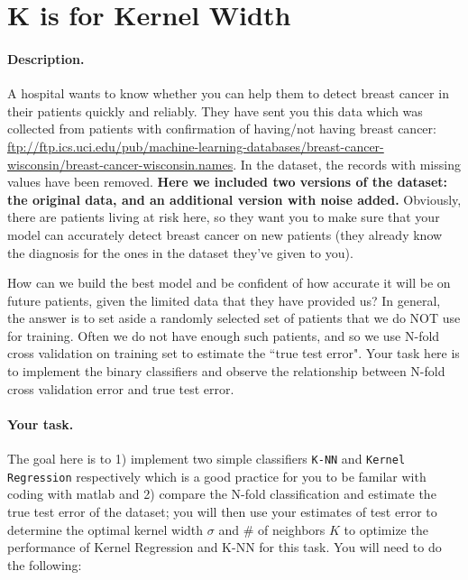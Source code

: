 \documentclass[english]{article}
\begin{document}
\section{K is for Kernel Width }

\paragraph{Description.} A hospital wants to know whether you can help them to detect breast cancer in their patients quickly and reliably.
They have sent you this data which was collected from patients with confirmation of having/not having breast cancer: \url{ftp://ftp.ics.uci.edu/pub/machine-learning-databases/breast-cancer-wisconsin/breast-cancer-wisconsin.names}. 
In the dataset, the records with missing values have been removed. 
{\bf Here we included two versions of the dataset: the original data, and an additional version with noise added.} 
Obviously, there are patients living at risk here, so they want you to make sure that your model can accurately detect breast cancer on new patients (they already know the diagnosis for the ones in the dataset they've given to you).

How can we build the best model and be confident of how accurate it will be on future patients, given the limited data that they have provided us? In general, the answer is to set aside a randomly selected set of patients that we do NOT use for training. Often we do not have enough such patients, and so we use N-fold cross validation on training set to estimate the ``true test error". Your task here is to implement the binary classifiers and observe the relationship between N-fold cross validation error and true test error.

\paragraph{Your task.}
The goal here is to 1) implement two simple classifiers {\tt K-NN} and {\tt Kernel Regression} respectively which is a good practice for you to be familar with coding with matlab and 2) compare the N-fold classification and estimate the true test error of the dataset; 
you will then use your estimates of test error to determine the optimal kernel width $\sigma$ and \# of neighbors $K$ to optimize the performance of Kernel Regression and K-NN for this task. 
You will need to do the following:
\end{document}
